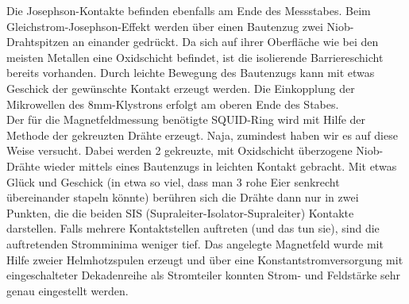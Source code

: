 		Die Josephson-Kontakte befinden ebenfalls am Ende des Messstabes.
		Beim Gleichstrom-Josephson-Effekt werden über einen Bautenzug zwei Niob-Drahtspitzen an einander gedrückt.
		Da sich auf ihrer Oberfläche wie bei den meisten Metallen eine Oxidschicht befindet, ist die isolierende Barriereschicht bereits vorhanden.
		Durch leichte Bewegung des Bautenzugs kann mit etwas Geschick der gewünschte Kontakt erzeugt werden.
		Die Einkopplung der Mikrowellen des 8mm-Klystrons erfolgt am oberen Ende des Stabes.
		\\
		Der für die Magnetfeldmessung benötigte SQUID-Ring wird mit Hilfe der Methode der gekreuzten Drähte erzeugt.
		Naja, zumindest haben wir es auf diese Weise versucht.
		Dabei werden 2 gekreuzte, mit Oxidschicht überzogene Niob-Drähte wieder mittels eines Bautenzugs in leichten Kontakt gebracht.
		Mit etwas Glück und Geschick (in etwa so viel, dass man 3 rohe Eier senkrecht übereinander stapeln könnte) berühren sich die Drähte dann nur in zwei Punkten, die die beiden SIS (Supraleiter-Isolator-Supraleiter) Kontakte darstellen.
		Falls mehrere Kontaktstellen auftreten (und das tun sie), sind die auftretenden Stromminima weniger tief.
		Das angelegte Magnetfeld wurde mit Hilfe zweier Helmhotzspulen erzeugt und über eine Konstantstromversorgung mit eingeschalteter Dekadenreihe als Stromteiler konnten Strom- und Feldstärke sehr genau eingestellt werden.

	


